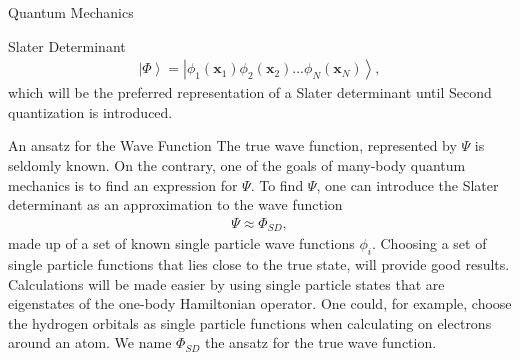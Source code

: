 \documentclass[twoside,english]{uiofysmaster}
\begin{document}
\begin{chapter}{Quantum Mechanics}
\begin{section}{Slater Determinant}
		\begin{align}
			\left| \Phi \right > = \left| \phi_1(\mathbf{x}_1) \phi_2(\mathbf{x}_2) ... \phi_N({\mathbf{x}_N}) \right>,  
		\end{align}
		which will be the preferred representation of a Slater determinant until Second quantization is introduced. 
	\end{section}

	\begin{section}{An ansatz for the Wave Function}
		The true wave function, represented by $\Psi$ is
                seldomly known. On the contrary, one of the goals of
                many-body quantum mechanics is to find an expression
                for $\Psi $. To find $\Psi$, one can introduce the
                Slater determinant as an approximation to the wave
                function
		\begin{align}
			\Psi \approx \Phi_{SD},
		\end{align}
		made up of a set of known single particle wave functions $\phi_i$. Choosing a set of single particle functions that lies close to the true state, will provide good results. Calculations will be made easier by using single particle states that are eigenstates of the one-body Hamiltonian operator. One could, for example, choose the hydrogen orbitals as single particle functions when calculating on electrons around an atom. We name $\Phi_{SD}$ the ansatz for the true wave function. 
	\end{section}


\end{chapter}
\end{document}
